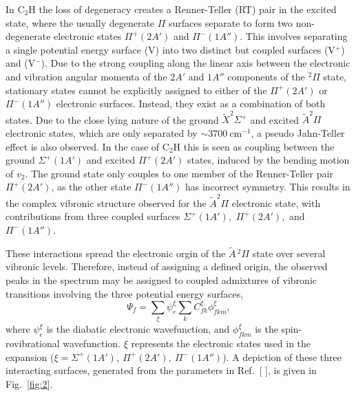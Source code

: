 \documentclass[journal=jpcafh,manuscript=article,layout=onecolumn, 12pt]{achemso}
\newcommand{\onlinecite}[1]{\hspace{-1 ex} \nocite{#1}\citenum{#1}}
\begin{document}
In C$_2$H the loss of degeneracy creates a Renner-Teller (RT) pair in the excited state, where the usually degenerate $\Pi$ surfaces separate to form two non-degenerate electronic states $\Pi^+ (2A')$ and $\Pi^-(1A'')$. This involves separating a single potential energy surface (V) into two distinct but coupled surfaces (V$^+$) and (V$^-$). Due to the strong coupling along the linear axis between the electronic and vibration angular momenta of the $2A'$ and $1A''$ components of the $^2\Pi$ state, stationary states cannot be explicitly assigned to either of the $\Pi^+(2A')$ or $\Pi^-(1A'')$ electronic surfaces. Instead, they exist as a combination of both states. Due to the close lying nature of the ground {$\tilde{X} ^2\Sigma^+$} and excited {$\tilde{A} ^2\Pi$} electronic states, which are only separated by $\sim3700~$cm$^{-1}$, a pseudo Jahn-Teller effect is also observed. %
In the case of C$_2$H this is seen as coupling between the ground $\Sigma^+(1A')$ and excited $\Pi^+(2A')$ states, induced by the bending motion of $v_2$. The ground state only couples to one member of the Renner-Teller pair $\Pi^+(2A')$, as the other state $\Pi^-(1A'')$ has incorrect symmetry. This results in the complex vibronic structure observed for the $\tilde{A}^2\Pi$ electronic state, with contributions from three coupled surfaces $\Sigma^+(1A'),$ $\Pi^+(2A'),$ and $\Pi^-(1A'')$.

These interactions spread the electronic orgin of the $\tilde{A}\,^2\Pi$ state over several vibronic levels. Therefore, instead of assigning a defined origin, the observed peaks in the spectrum may be assigned to coupled admixtures of vibronic transitions involving the three potential energy surfaces,
\begin{equation}
\Psi_f = \sum_\xi \psi_e^\xi \sum_k C_{fk}^\xi\phi_{fkm}^\xi,
\label{eq:teller3} 
\end{equation}
where $\psi_e^\xi$ is the diabatic electronic wavefunction, and $\phi_{fkm}^\xi$ is the spin-rovibrational wavefunction. $\xi$ represents the electronic states used in the expansion ($\xi=\Sigma^+(1A'),~\Pi^+(2A'),~\Pi^-(1A'')$). A depiction of these three interacting surfaces, generated from the parameters in Ref.~[\onlinecite{tar03}], is given in Fig.~\ref{fig:2}.
\end{document}
